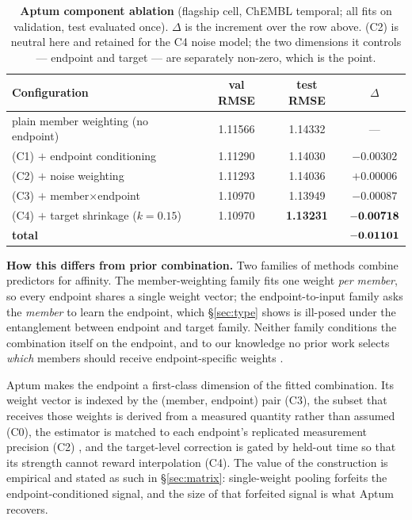 \documentclass[10pt,letterpaper]{article}
\newcommand{\best}[1]{\ifmmode\mathbf{#1}\else\textbf{#1}\fi}
\begin{document}
\begin{table}[htbp]
\centering
\small
\caption{\textbf{Aptum component ablation} (flagship cell, ChEMBL temporal; all fits
on validation, test evaluated once). $\Delta$ is the increment over the row above.
(C2) is neutral here and retained for the C4 noise model; the two dimensions it
controls --- endpoint and target --- are separately non-zero, which is the point.}
\label{tab:ablation}
\begin{tabular*}{\linewidth}{@{\extracolsep{\fill}}@{}lccc@{}}
\toprule
Configuration & val RMSE & test RMSE & $\Delta$ \\
\midrule
plain member weighting (no endpoint) & 1.11566 & 1.14332 & --- \\
(C1) $+$ endpoint conditioning        & 1.11290 & 1.14030 & $-0.00302$ \\
(C2) $+$ noise weighting              & 1.11293 & 1.14036 & $+0.00006$ \\
(C3) $+$ member$\times$endpoint       & 1.10970 & 1.13949 & $-0.00087$ \\
(C4) $+$ target shrinkage ($k{=}0.15$) & 1.10970 & \best{1.13231} & $\best{-0.00718}$ \\
\midrule
\textbf{total} & & & $\best{-0.01101}$ \\
\bottomrule
\end{tabular*}
\end{table}

\smallskip
\noindent\textbf{How this differs from prior combination.} Two families of methods
combine predictors for affinity. The member-weighting family
\citep{bates1969,wolpert1992,breiman1996} fits one weight \emph{per member}, so every
endpoint shares a single weight vector; the endpoint-to-input family asks the
\emph{member} to learn the endpoint, which \S\ref{sec:type} shows is ill-posed under
the entanglement between endpoint and target family. Neither family conditions the
combination itself on the endpoint, and to our knowledge no prior work selects
\emph{which} members should receive endpoint-specific weights \citep{vanderlaan2007}.

Aptum makes the endpoint a first-class dimension of the fitted combination. Its
weight vector is indexed by the (member, endpoint) pair (C3), the subset that receives
those weights is derived from a measured quantity rather than assumed (C0), the
estimator is matched to each endpoint's replicated measurement precision (C2) \citep{lawson1974}, and the
target-level correction is gated by held-out time so that its strength cannot reward
interpolation (C4). The value of the construction is empirical and stated as such in
\S\ref{sec:matrix}: single-weight pooling forfeits the endpoint-conditioned signal,
and the size of that forfeited signal is what Aptum recovers.
\end{document}
